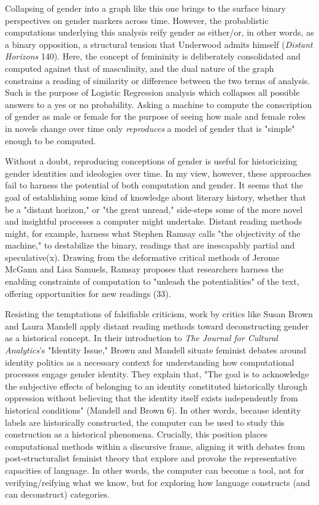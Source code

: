 \documentclass[11pt]{article}
\begin{document}
Collapsing of gender into a graph like this one brings to the surface
binary perspectives on gender markers across time. However, the
probablistic computations underlying this analysis reify gender as
either/or, in other words, as a binary opposition, a structural
tension that Underwood admits himself (\emph{Distant Horizons} 140). Here,
the concept of femininity is deliberately consolidated and computed
against that of masculinity, and the dual nature of the graph
constrains a reading of similarity or difference between the two terms
of analysis. Such is the purpose of Logistic Regression analysis which
collapses all possible answers to a yes or no probability. Asking a
machine to compute the conscription of gender as male or female for
the purpose of seeing how male and female roles in novels change over
time only \emph{reproduces} a model of gender that is "simple" enough to be
computed.

Without a doubt, reproducing conceptions of gender is useful for
historicizing gender identities and ideologies over time. In my view,
however, these approaches fail to harness the potential of both
computation and gender. It seems that the goal of establishing some
kind of knowledge about literary history, whether that be a "distant
horizon," or "the great unread," side-steps some of the more novel and
insightful processes a computer might undertake. Distant reading
methods might, for example, harness what Stephen Ramsay calls "the
objectivity of the machine," to destabilize the binary, readings that
are inescapably partial and speculative(x). Drawing from the
deformative critical methods of Jerome McGann and Lisa Samuels, Ramsay
proposes that researchers harness the enabling constraints of
computation to "unleash the potentialities" of the text, offering
opportunities for new readings (33).

Resisting the temptations of falsifiable criticism, work by critics
like Susan Brown and Laura Mandell apply distant reading methods
toward deconstructing gender as a historical concept. In their
introduction to \emph{The Journal for Cultural Analytics}'s "Identity
Issue," Brown and Mandell situate feminist debates around identity
politics as a necessary context for understanding how computational
processes engage gender identity. They explain that, "The goal is to
acknowledge the subjective effects of belonging to an identity
constituted historically through oppression without believing that the
identity itself exists independently from historical conditions"
(Mandell and Brown 6). In other words, because identity labels are
historically constructed, the computer can be used to study this
construction as a historical phenomena. Crucially, this position
places computational methods within a discursive frame, aligning it
with debates from post-structuralist feminist theory that explore and
provoke the representative capacities of language. In other words, the
computer can become a tool, not for verifying/reifying what we know,
but for exploring how language constructs (and can deconstruct)
categories.
\end{document}
